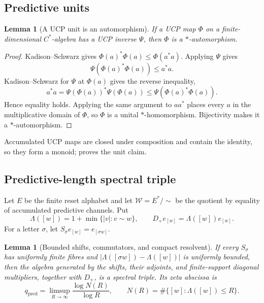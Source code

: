 \documentclass[11pt]{article}
\newtheorem{lemma}[theorem]{Lemma}
\theoremstyle{definition}
\theoremstyle{remark}
\newcommand{\W}{\mathcal W}
\newcommand{\pred}{\mathrm{pred}}
\begin{document}
\subsection{Predictive units}

\begin{lemma}[A UCP unit is an automorphism]
\label{lem:app-ucp-unit}
If a UCP map $\Phi$ on a finite-dimensional $C^*$-algebra has a UCP inverse
$\Psi$, then $\Phi$ is a $*$-automorphism.
\end{lemma}

\begin{proof}
Kadison--Schwarz gives
$\Phi(a)^*\Phi(a)\le\Phi(a^*a)$.  Applying $\Psi$ gives
\[
 \Psi(\Phi(a)^*\Phi(a))\le a^*a.
\]
Kadison--Schwarz for $\Psi$ at $\Phi(a)$ gives the reverse inequality,
\[
 a^*a=\Psi(\Phi(a))^*\Psi(\Phi(a))
 \le\Psi(\Phi(a)^*\Phi(a)).
\]
Hence equality holds.  Applying the same argument to $aa^*$ places every $a$ in
the multiplicative domain of $\Phi$, so $\Phi$ is a unital $*$-homomorphism.
Bijectivity makes it a $*$-automorphism.
\end{proof}

Accumulated UCP maps are closed under composition and contain the identity, so
they form a monoid;  proves the unit claim.

\subsection{Predictive-length spectral triple}

Let $E$ be the finite reset alphabet and let $\W=E^*/\!\sim$ be the quotient by
equality of accumulated predictive channels.  Put
\[
 \Lambda([w])=1+\min\{|v|:v\sim w\},
 \qquad
 D_+e_{[w]}=\Lambda([w])e_{[w]}.
\]
For a letter $\sigma$, let
$S_\sigma e_{[w]}=e_{[\sigma w]}$.

\begin{lemma}[Bounded shifts, commutators, and compact resolvent]
\label{lem:app-positive-triple}
If every $S_\sigma$ has uniformly finite fibres and
$|\Lambda([\sigma w])-\Lambda([w])|$ is uniformly bounded, then the algebra
generated by the shifts, their adjoints, and finite-support diagonal
multipliers, together with $D_+$, is a spectral triple.  Its zeta abscissa is
\[
 q_{\pred}=\limsup_{R\to\infty}
 \frac{\log N(R)}{\log R},
 \qquad N(R)=\#\{[w]:\Lambda([w])\le R\}.
\]
\end{lemma}
\end{document}
